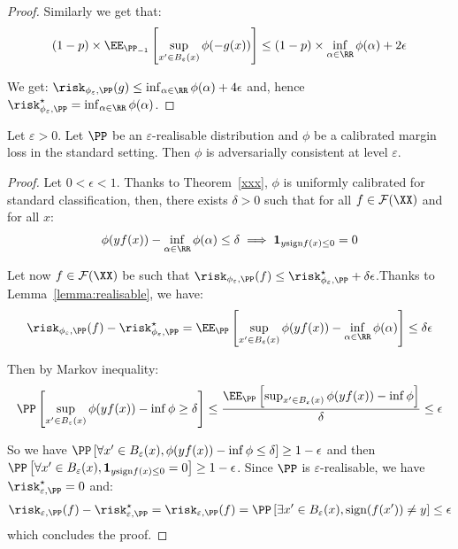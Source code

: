 \begin{proof}
Similarly we get that:
\begin{align*}
(1-p)\times\EE_{\PP_{-1}}\left[\sup_{x'\in B_\varepsilon(x)}\phi(-g(x))\right] \leq(1-p)\times\inf_{\alpha\in\RR}\phi(\alpha)+2\epsilon
\end{align*}

We get: $\risk_{\phi_\varepsilon,\PP}(g)\leq \inf_{\alpha\in\RR}\phi(\alpha)+4\epsilon$ and, hence $\risk^\star_{\phi_\varepsilon,\PP}=\inf_{\alpha\in\RR}\phi(\alpha)$.
\end{proof}


\begin{prop*}

Let $\varepsilon>0$. Let $\PP$ be an $\varepsilon$-realisable distribution and $\phi$ be a calibrated margin loss in the standard setting. Then $\phi$ is adversarially consistent at level $\varepsilon$. 
\end{prop*}
\begin{proof}
Let $0<\epsilon<1$. Thanks to Theorem~\ref{xxx}, $\phi$ is uniformly calibrated for standard classification, then, there exists $\delta>0$ such that for all $f\in\mathcal{F}(\XX)$ and for all $x$:
\begin{align*}
    \phi(yf(x))-\inf_{\alpha\in\RR}\phi(\alpha)\leq \delta \implies \mathbf{1}_{y\text{sign}f(x)\leq 0} = 0
\end{align*}

Let now $f\in\mathcal{F}(\XX)$ be such that  $\risk_{\phi_\varepsilon,\PP}(f)\leq \risk_{\phi_\varepsilon,\PP}^\star+\delta\epsilon$.Thanks to Lemma~\ref{lemma:realisable},  we have:
\begin{align*}
\risk_{\phi_\varepsilon,\PP}(f)- \risk_{\phi_\varepsilon,\PP}^\star = \EE_{\PP}\left[\sup_{x'\in B_\varepsilon(x)}\phi(yf(x))-\inf_{\alpha \in \RR} \phi(\alpha)\right]\leq\delta\epsilon
\end{align*}

Then by Markov inequality:
\begin{align*}
    \PP\left[\sup_{x'\in B_\varepsilon(x)}\phi(yf(x))-\inf \phi\geq\delta\right]\leq\frac{\EE_{\PP}\left[\sup_{x'\in B_\varepsilon(x)}\phi(yf(x))-\inf \phi\right]}{\delta}\leq \epsilon
\end{align*}

So we have $\PP\left[\forall x'\in B_\varepsilon(x),\phi(yf(x))-\inf \phi\leq\delta\right]\geq1-\epsilon$ and then $\PP\left[\forall x'\in B_\varepsilon(x),\mathbf{1}_{y\text{sign}f(x)\leq 0} = 0\right]\geq1-\epsilon$. Since $\PP$ is $\varepsilon$-realisable, we have $\risk_{\varepsilon,\PP}^\star=0$ and:
\begin{align*}
     \risk_{\varepsilon,\PP}(f)- \risk_{\varepsilon,\PP}^\star =  \risk_{\varepsilon,\PP}(f) =\PP\left[\exists x'\in B_\varepsilon(x), \text{sign}(f(x'))\neq y\right]\leq \epsilon
\end{align*}
which concludes the proof.
\end{proof}



